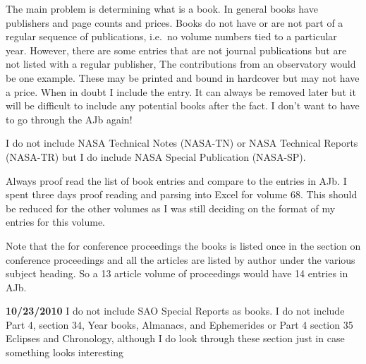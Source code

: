The main problem is determining what is a book. In general books have
publishers and page counts and prices.  Books do not have or are not
part of a regular sequence of publications, i.e.\ no volume numbers
tied to a particular year.  However, there are some entries that are
not journal publications but are not listed with a regular publisher,
The contributions from an observatory would be one example.  These may
be printed and bound in hardcover but may not have a price.  When in
doubt I include the entry.  It can always be removed later but it will
be difficult to include any potential books after the fact. I don't
want to have to go through the AJb again!

I do not include NASA Technical Notes (NASA-TN) or NASA Technical
Reports (NASA-TR) but I do include NASA Special Publication (NASA-SP).

Always proof read the list of book entries and compare to the entries
in AJb. I spent three days proof reading and parsing into Excel for
volume 68. This should be reduced for the other volumes as I was still
deciding on the format of my entries for this volume.

Note that the for conference proceedings the books is listed once in
the section on conference proceedings and all the articles are listed
by author under the various subject heading. So a 13 article volume of
proceedings would have 14 entries in AJb.

{\bf 10/23/2010}
I do not include SAO Special Reports as books. I do not include Part
4, section 34, Year books, Almanacs, and Ephemerides or Part 4 section
35 Eclipses and Chronology, although I do look through these section
just in case something looks interesting

